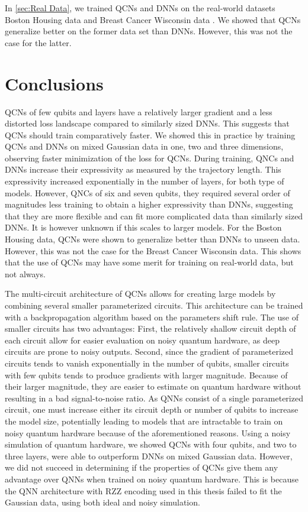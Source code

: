 In \cref{sec:Real Data}, we trained QCNs and DNNs on the real-world datasets Boston Housing data \cite{boston} and Breast Cancer Wisconsin data \cite{cancer}. We showed that QCNs generalize better on the former data set than DNNs. However, this was not the case for the latter.  


\section{Conclusions}\label{sec:conclusion}
QCNs of few qubits and layers have a relatively larger gradient and a less distorted loss landscape compared to similarly sized DNNs. This suggests that QCNs should train comparatively faster. We showed this in practice by training QCNs and DNNs on mixed Gaussian data in one, two and three dimensions, observing faster minimization of the loss for QCNs. During training, QNCs and DNNs increase their expressivity as measured by the trajectory length. This expressivity increased exponentially in the number of layers, for both type of models. However, QNCs of six and seven qubits, they required several order of magnitudes less training to obtain a higher expressivity than DNNs, suggesting that they are more flexible and can fit more complicated data than similarly sized DNNs. It is however unknown if this scales to larger models. For the Boston Housing data, QCNs were shown to generalize better than DNNs to unseen data. However, this was not the case for the Breast Cancer Wisconsin data. This shows that the use of QCNs may have some merit for training on real-world data, but not always.

The multi-circuit architecture of QCNs allows for creating large models by combining several smaller parameterized circuits. This architecture can be trained with a backpropagation algorithm based on the parameters shift rule. The use of smaller circuits has two advantages: First, the relatively shallow circuit depth of each circuit allow for easier evaluation on noisy quantum hardware, as deep circuits are prone to noisy outputs. Second, since the gradient of parameterized circuits tends to vanish exponentially in the number of qubits, smaller circuits with few qubits tends to produce gradients with larger magnitude. Because of their larger magnitude, they are easier to estimate on quantum hardware without resulting in a bad signal-to-noise ratio.
As QNNs consist of a single parameterized circuit, one must increase either its circuit depth or number of qubits to increase the model size, potentially leading to models that are intractable to train on noisy quantum hardware because of the aforementioned reasons. Using a noisy simulation of quantum hardware, we showed QCNs with four qubits, and two to three layers, were able to outperform DNNs on mixed Gaussian data. However, we did not succeed in determining if the properties of QCNs give them any advantage over QNNs when trained on noisy quantum hardware. This is because the QNN architecture with RZZ encoding used in this thesis failed to fit the Gaussian data, using both ideal and noisy simulation. 

